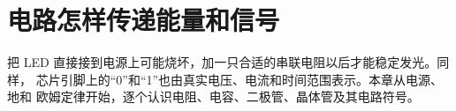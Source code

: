 \chapter{电路怎样传递能量和信号}

把 LED 直接接到电源上可能烧坏，加一只合适的串联电阻以后才能稳定发光。同样，
芯片引脚上的“0”和“1”也由真实电压、电流和时间范围表示。本章从电源、地和
欧姆定律开始，逐个认识电阻、电容、二极管、晶体管及其电路符号。


